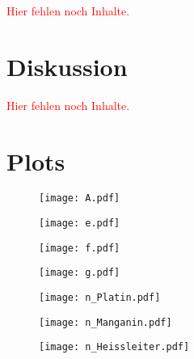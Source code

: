 \documentclass[11pt, ngerman]{article}
\newcommand{\fehlt}{\textcolor{red}{Hier fehlen noch Inhalte.}}
\begin{document}
\fehlt


\section{Diskussion}

\fehlt



\newpage

\section{Plots}

\begin{figure}[h!]
	\centering
	\texttt{[image: A.pdf]}
	\label{fig:A}
\end{figure}

\begin{figure}[h!]
	\centering
	\texttt{[image: e.pdf]}
	\label{fig:e}
\end{figure}

\begin{figure}[h!]
	\centering
	\texttt{[image: f.pdf]}
	\label{fig:f}
\end{figure}

\begin{figure}[h!]
	\centering
	\texttt{[image: g.pdf]}
	\label{fig:g}
\end{figure}

\begin{figure}[h!]
	\centering
	\texttt{[image: n\_Platin.pdf]}
	\label{fig:metall}
\end{figure}

\begin{figure}[h!]
	\centering
	\texttt{[image: n\_Manganin.pdf]}
	\label{fig:metall}
\end{figure}

\begin{figure}[h!]
	\centering
	\texttt{[image: n\_Heissleiter.pdf]}
	\label{fig:rt}
\end{figure}
\end{document}
